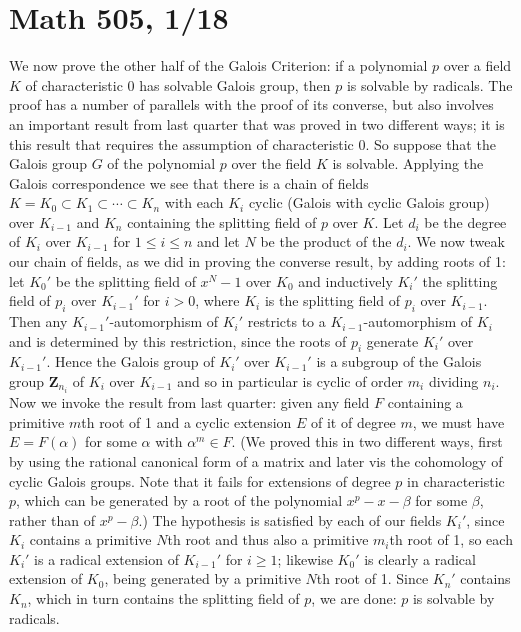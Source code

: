 \documentclass[10pt]{article}
\begin{document}
\section*{Math 505, 1/18}

We now prove the other half of the Galois Criterion: if a polynomial $p$
over a field $K$ of characteristic 0 has solvable Galois group, then $p$
is solvable by radicals. The proof has a number of parallels with the
proof of its converse, but also involves an important result from last
quarter that was proved in two different ways; it is this result that
requires the assumption of characteristic 0. So suppose that the Galois
group $G$ of the polynomial $p$ over the field $K$ is solvable. Applying
the Galois correspondence we see that there is a chain of fields
$K=K_0\subset K_1\subset\cdots\subset K_n$ with each $K_i$ cyclic
(Galois with cyclic Galois group) over $K_{i-1}$ and $K_n$ containing
the splitting field of $p$ over $K$. Let $d_i$ be the degree of $K_i$
over $K_{i-1}$ for $1\le i\le n$ and let $N$ be the product of the
$d_i$. We now tweak our chain of fields, as we did in proving the
converse result, by adding roots of 1: let $K_0'$ be the splitting field
of $x^N - 1$ over $K_0$ and inductively $K_i'$ the splitting field of
$p_i$ over $K_{i-1}'$ for $i>0$, where $K_i$ is the splitting field of
$p_i$ over $K_{i-1}$. Then any $K_{i-1}'$-automorphism of $K_i'$
restricts to a $K_{i-1}$-automorphism of $K_i$ and is determined by this
restriction, since the roots of $p_i$ generate $K_i'$ over $K_{i-1}'$.
Hence the Galois group of $K_i'$ over $K_{i-1}'$ is a subgroup of the
Galois group $\mathbf Z_{n_i}$ of $K_i$ over $K_{i-1}$ and so in
particular is cyclic of order $m_i$ dividing $n_i$. Now we invoke the
result from last quarter: given any field $F$ containing a primitive
$m$th root of 1 and a cyclic extension $E$ of it of degree $m$, we must
have $E=F(\alpha)$ for some $\alpha$ with $\alpha^m\in F$. (We proved
this in two different ways, first by using the rational canonical form
of a matrix and later vis the cohomology of cyclic Galois groups. Note
that it fails for extensions of degree $p$ in characteristic $p$, which
can be generated by a root of the polynomial $x^p - x - \beta$ for some
$\beta$, rather than of $x^p - \beta$.) The hypothesis is satisfied by
each of our fields $K_i'$, since $K_i$ contains a primitive $N$th root
and thus also a primitive $m_i$th root of 1, so each $K_i'$ is a radical
extension of $K_{i-1}'$ for $i\ge1$; likewise $K_0'$ is clearly a
radical extension of $K_0$, being generated by a primitive $N$th root of
1. Since $K_n'$ contains $K_n$, which in turn contains the splitting
field of $p$, we are done: $p$ is solvable by radicals.
\end{document}
